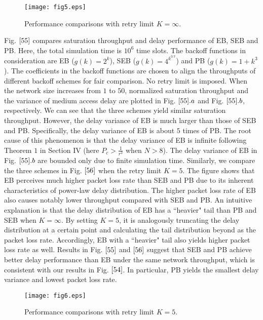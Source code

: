 \documentclass[journal]{IEEEtran}
\begin{document}
\begin{figure}
\centering
  \begin{center}
    \texttt{[image: fig5.eps]}
  \end{center}
  \caption{Performance comparisons with retry limit $K=\infty$.}
  \label{55}
\end{figure}

Fig. $\ref{55}$ compares saturation throughput and delay performance of EB, SEB and PB. Here, the total simulation time is $10^6$ time slots. The backoff functions in consideration are EB ($g(k)=2^k$), SEB ($g(k)=4^{k^{0.7}}$) and PB ($g(k)=1+k^3$). The coefficients in the backoff functions are chosen to align the throughputs of different backoff schemes for fair comparison. No retry limit is imposed. When the network size increases from $1$ to $50$, normalized saturation throughput and the variance of medium access delay are plotted in Fig. $\ref{55}.a$ and Fig. $\ref{55}.b$, respectively. We can see that the three schemes yield similar saturation throughput. However, the delay variance of EB is much larger than those of SEB and PB. Specifically, the delay variance of EB is about $5$ times of PB. The root cause of this phenomenon is that the delay variance of EB is infinite following Theorem $1$ in Section IV (here $P_c> \frac{1}{r^2}$ when $N>8$). The delay variance of EB in Fig. $\ref{55}.b$ are bounded only due to finite simulation time. Similarly, we compare the three schemes in Fig. $\ref{56}$ when the retry limit $K=5$. The figure shows that EB perceives much higher packet loss rate than SEB and PB due to its inherent characteristics of power-law delay distribution. The higher packet loss rate of EB also causes notably lower throughput compared with SEB and PB. An intuitive explanation is that the delay distribution of EB has a ``heavier" tail than PB and SEB when $K=\infty$. By setting $K=5$, it is analogously truncating the delay distribution at a certain point and calculating the tail distribution beyond as the packet loss rate. Accordingly, EB with a ``heavier" tail also yields higher packet loss rate as well. Results in Fig. $\ref{55}$ and $\ref{56}$ suggest that SEB and PB achieve better delay performance than EB under the same network throughput, which is consistent with our results in Fig. $\ref{54}$. In particular, PB yields the smallest delay variance and lowest packet loss rate.


\begin{figure}
\centering
  \begin{center}
    \texttt{[image: fig6.eps]}
  \end{center}
  \caption{Performance comparisons with retry limit $K=5$.}
  \label{56}
\end{figure}
\end{document}
